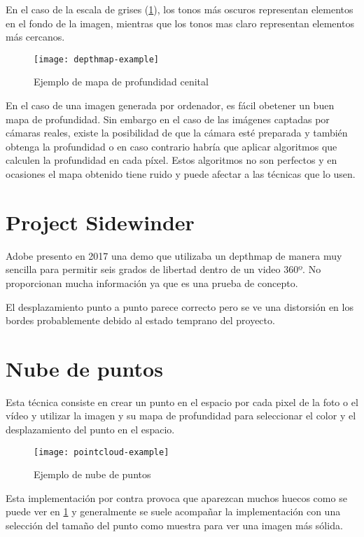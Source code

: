 En el caso de la escala de grises (\ref{fig:depthmap-example}), los tonos más oscuros representan elementos en el fondo de la imagen, mientras que los tonos mas claro representan elementos más cercanos.
\begin{figure}[h]
  \centering
  \texttt{[image: depthmap-example]}
  \caption{Ejemplo de mapa de profundidad cenital}
  \label{fig:depthmap-example}
\end{figure}

En el caso de una imagen generada por ordenador, es fácil obetener un buen mapa de profundidad. Sin embargo en el caso de las imágenes captadas por cámaras reales, existe la posibilidad de que la cámara esté preparada y también obtenga la profundidad o en caso contrario habría que aplicar algoritmos que calculen la profundidad en cada píxel. Estos algoritmos no son perfectos y en ocasiones el mapa obtenido tiene ruido y puede afectar a las técnicas que lo usen.

\section{Project Sidewinder}
Adobe presento en 2017 \cite{SidewinderAdobe} una demo que utilizaba un depthmap de manera muy sencilla para permitir seis grados de libertad dentro de un video 360º. No proporcionan mucha información ya que es una prueba de concepto.

El desplazamiento punto a punto parece correcto pero se ve una distorsión en los bordes probablemente debido al estado temprano del proyecto.

\section{Nube de puntos}
Esta técnica consiste en crear un punto en el espacio por cada pixel de la foto o el vídeo y utilizar la imagen y su mapa de profundidad para seleccionar el color y el desplazamiento del punto en el espacio. \cite{UploadVR}

\begin{figure}[h]
  \centering
  \texttt{[image: pointcloud-example]}
  \caption{Ejemplo de nube de puntos}
  \label{fig:pointcloud-example}
\end{figure}

Esta implementación por contra provoca que aparezcan muchos huecos como se puede ver en \ref{fig:depthmap-example} y generalmente se suele acompañar la implementación con una selección del tamaño del punto como muestra \cite{Josh6DoFUnity} para ver una imagen más sólida.

